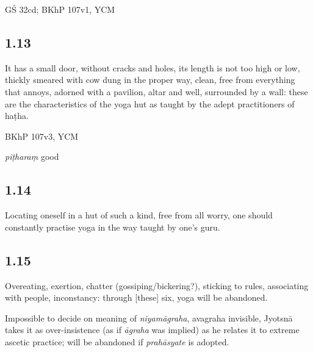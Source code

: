 \begin{ekdosis}
\begin{sources}[hp01_012]
GŚ 32cd; BKhP 107v1, YCM
\end{sources}


\subsection*{1.13}
\begin{translation}[hp01_013]
It has a small door, without cracks and holes, its length is not too high or low, thickly smeared with cow dung in the proper way, clean, free from everything that annoys, adorned with a pavilion, altar and well, surrounded by a wall: these are the characteristics of the yoga hut as taught by the adept practitioners of haṭha.
\end{translation}

\begin{sources}[hp01_013]
BKhP 107v3, YCM
 \end{sources}

\begin{philcomm}[hp01_013]          
\emph{piṭharaṃ} good
\end{philcomm}

\subsection*{1.14}
\begin{translation}[hp01_014]
Locating oneself in a hut of such a kind, free from all worry, one should constantly practise yoga in the way taught by one's guru.
\end{translation}


\subsection*{1.15}
\begin{translation}[hp01_015]
Overeating, exertion, chatter (gossiping/bickering?), sticking to rules, associating with people, inconstancy: through [these] six, yoga will be abandoned.
\end{translation}

\begin{philcomm}[hp01_015]          
Impossible to decide on meaning of \emph{niyamāgraha}, avagraha invisible, Jyotsnā takes it as over-insistence (as if \emph{āgraha} was implied) as he relates it to extreme ascetic practice; will be abandoned if \emph{prahāsyate} is adopted.
\end{philcomm}


\end{ekdosis}
